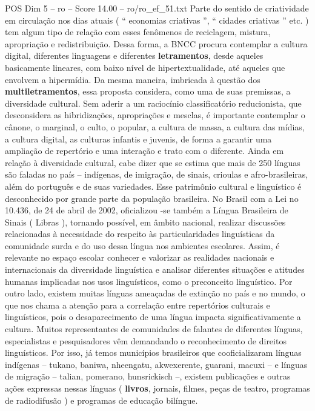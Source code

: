 \begin{textsample}{POS Dim 5 – ro – Score 14.00 – ro/ro\_ef\_51.txt}
Parte do sentido de criatividade em circulação nos dias atuais ( “ economias criativas ”, “ cidades criativas ” etc. ) tem algum tipo de relação com esses fenômenos de reciclagem, mistura, apropriação e redistribuição.
Dessa forma, a BNCC procura contemplar a cultura digital, diferentes linguagens e diferentes \textbf{letramentos}, desde aqueles basicamente lineares, com baixo nível de hipertextualidade, até aqueles que envolvem a hipermídia.
Da mesma maneira, imbricada à questão dos \textbf{multiletramentos}, essa proposta considera, como uma de suas premissas, a diversidade cultural.
Sem aderir a um raciocínio classificatório reducionista, que desconsidera as hibridizações, apropriações e mesclas, é importante contemplar o cânone, o marginal, o culto, o popular, a cultura de massa, a cultura das mídias, a cultura digital, as culturas infantis e juvenis, de forma a garantir uma ampliação de repertório e uma interação e trato com o diferente.
Ainda em relação à diversidade cultural, cabe dizer que se estima que mais de 250 línguas são faladas no país – indígenas, de imigração, de sinais, crioulas e afro-brasileiras, além do português e de suas variedades.
Esse patrimônio cultural e linguístico é desconhecido por grande parte da população brasileira.
No Brasil com a Lei no 10.436, de 24 de abril de 2002, oficializou -se também a Língua Brasileira de Sinais ( Libras ), tornando possível, em âmbito nacional, realizar discussões relacionadas à necessidade do respeito às particularidades linguísticas da comunidade surda e do uso dessa língua nos ambientes escolares.
Assim, é relevante no espaço escolar conhecer e valorizar as realidades nacionais e internacionais da diversidade linguística e analisar diferentes situações e atitudes humanas implicadas nos usos linguísticos, como o preconceito linguístico.
Por outro lado, existem muitas línguas ameaçadas de extinção no país e no mundo, o que nos chama a atenção para a correlação entre repertórios culturais e linguísticos, pois o desaparecimento de uma língua impacta significativamente a cultura.
Muitos representantes de comunidades de falantes de diferentes línguas, especialistas e pesquisadores vêm demandando o reconhecimento de direitos linguísticos.
Por isso, já temos municípios brasileiros que cooficializaram línguas indígenas – tukano, baniwa, nheengatu, akwexerente, guarani, macuxi – e línguas de migração – talian, pomerano, hunsrickisch –, existem publicações e outras ações expressas nessas línguas ( \textbf{livros}, jornais, filmes, peças de teatro, programas de radiodifusão ) e programas de educação bilíngue.

\end{textsample}
